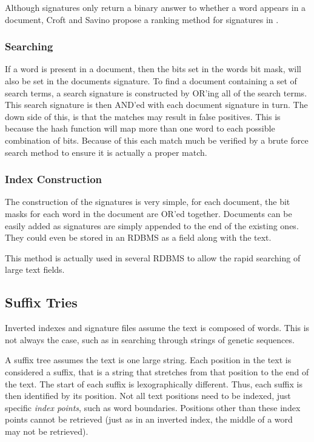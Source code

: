 Although signatures only return a binary answer to whether a word appears in a document, Croft and Savino propose a ranking method for signatures in \cite{Croft88}.

\subsubsection{Searching}
If a word is present in a document, then the bits set in the words bit
mask, will also be set in the documents signature.  To find a document
containing a set of search terms, a search signature is constructed by
OR'ing all of the search terms.   This search signature is then AND'ed
with each document signature in turn.  The down side of this, is that the
matches may result in false positives.  This is because the hash function
will map more than one word to each possible combination of bits.  Because
of this each match much be verified by a brute force search method to
ensure it is actually a proper match.

\subsubsection{Index Construction}
The construction of the signatures is very simple, for each document, the
bit masks for each word in the document are OR'ed together.  Documents can
be easily added as signatures are simply appended to the end of the
existing ones.  They could even be stored in an RDBMS as a field along
with the text.

This method is actually used in several RDBMS to allow the rapid searching
of large text fields.

\subsection{Suffix Tries}
Inverted indexes and signature files assume the text is composed of words.
This is not always the case, such as in searching through strings of
genetic sequences.

A suffix tree assumes the text is one large string.  Each position in the
text is considered a suffix, that is a string that stretches from that
position to the end of the text.  The start of each suffix is
lexographically different.  Thus, each suffix is then identified by its
position.  Not all text positions need to be indexed, just specific
\emph{index points}, such as word boundaries.  Positions other than these
index points cannot be retrieved (just as in an inverted index, the middle
of a word may not be retrieved).




